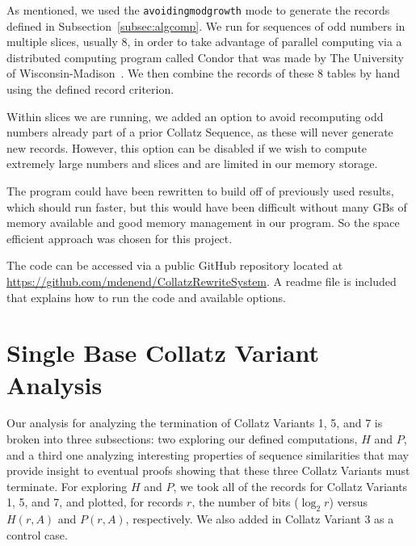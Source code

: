 As mentioned, we used the {\tt avoidingmodgrowth} mode to generate the records defined in Subsection~\ref{subsec:algcomp}. We run for sequences of odd numbers in multiple slices, usually 8, in order to take advantage of parallel computing via a distributed computing program called Condor that was made by The University of Wisconsin-Madison~\cite{Thain:2005:DCP:1064323.1064336}. We then combine the records of these 8 tables by hand using the defined record criterion. \par
Within slices we are running, we added an option to avoid recomputing odd numbers already part of a prior Collatz Sequence, as these will never generate new records. However, this option can be disabled if we wish to compute extremely large numbers and slices and are limited in our memory storage. \par
The program could have been rewritten to build off of previously used results, which should run faster, but this would have been difficult without many GBs of memory available and good memory management in our program. So the space efficient approach was chosen for this project.\par
The code can be accessed via a public GitHub repository located at \url{https://github.com/mdenend/CollatzRewriteSystem}. A readme file is included that explains how to run the code and available options.
\section{Single Base Collatz Variant Analysis} \label{subsec:algsinglebase}
Our analysis for analyzing the termination of Collatz Variants 1, 5, and 7 is broken into three subsections: two exploring our defined computations, $H$ and $P$, and a third one analyzing interesting properties of sequence similarities that may provide insight to eventual proofs showing that these three Collatz Variants must terminate.
For exploring $H$ and $P$, we took all of the records for Collatz Variants 1, 5, and 7, and plotted, for records $r$, the number of bits ($\log_2{r}$) versus $H(r,A)$ and $P(r,A)$, respectively. We also added in Collatz Variant 3 as a control case.
